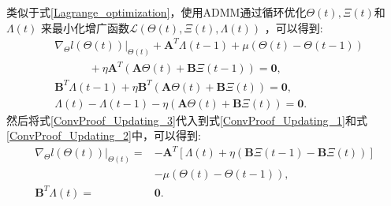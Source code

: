 类似于式\eqref{Lagrange_optimization}，使用ADMM通过循环优化$\boldsymbol{\varTheta}\left(t\right), \boldsymbol\varXi\left(t\right)$和$\boldsymbol\varLambda\left(t\right)$
来最小化增广函数$\mathcal{L}\left(\boldsymbol{\varTheta}\left(t\right), \boldsymbol \varXi\left(t\right),\boldsymbol \varLambda\left(t\right)\right)$
，可以得到:
\begin{subequations}
    \begin{align}
        &\left. \nabla_{\boldsymbol{\varTheta}} l\left(\boldsymbol{\varTheta} \left(t\right)\right)\right|_{\boldsymbol{\varTheta}\left(t\right)}
        + \boldsymbol A^T \boldsymbol \varLambda \left(t-1\right)
        + \mu  \left(\boldsymbol\varTheta\left(t\right) - \boldsymbol\varTheta\left(t-1\right)\right) \nonumber \\ 
        &~~~~~~~~~~~~~~
        + \eta \boldsymbol A^T \left( \boldsymbol A\boldsymbol{\varTheta}\left(t\right) + \boldsymbol B\boldsymbol \varXi\left(t-1\right)\right) 
        = \boldsymbol0,\label{ConvProof_Updating_1} \\
        &\boldsymbol B^T \boldsymbol \varLambda \left(t-1\right) 
        + \eta \boldsymbol B^T \left( \boldsymbol A\boldsymbol{\varTheta}\left(t\right) + \boldsymbol B\boldsymbol \varXi\left(t\right)\right) = \boldsymbol0,
        \label{ConvProof_Updating_2}\\
        &\boldsymbol \varLambda \left(t\right)
        - \boldsymbol \varLambda \left(t-1\right)
        - \eta \left( \boldsymbol A\boldsymbol{\varTheta}\left(t\right) + \boldsymbol B\boldsymbol \varXi\left(t\right)\right) = \boldsymbol0.
        \label{ConvProof_Updating_3}
    \end{align}
\end{subequations}
然后将式\eqref{ConvProof_Updating_3}代入到式\eqref{ConvProof_Updating_1}和式\eqref{ConvProof_Updating_2}中，可以得到:
\begin{subequations}
    \label{Conv_temp}
    \begin{align}
        \left. \nabla_{\boldsymbol{\varTheta}} l\left(\boldsymbol{\varTheta} \left(t\right)\right)\right|_{\boldsymbol{\varTheta}\left(t\right)}
        =&- \boldsymbol A^T \left[ \boldsymbol \varLambda \left(t\right) + \eta \left( \boldsymbol B\boldsymbol \varXi\left(t-1\right) 
        - \boldsymbol B\boldsymbol \varXi\left(t\right) \right) \right] \nonumber\\
        &- \mu \left(\boldsymbol\varTheta\left(t\right) - \boldsymbol\varTheta\left(t-1\right)\right), \\
        \boldsymbol B^T \boldsymbol \varLambda \left(t\right) =& \boldsymbol0 \label{B_lambda_0}.
    \end{align}
\end{subequations}
